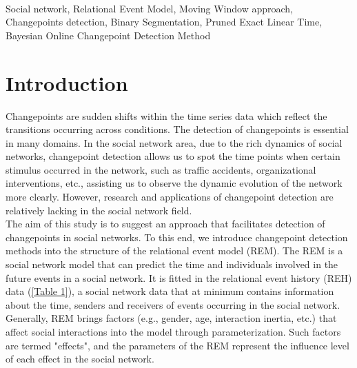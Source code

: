 \documentclass[]{interact}
\theoremstyle{plain}%
\theoremstyle{definition}
\theoremstyle{remark}
\begin{document}
	 \\
	{\small{Social network, Relational Event Model, Moving Window approach, Changepoints detection, Binary Segmentation, Pruned Exact Linear Time, Bayesian Online Changepoint Detection Method}
	
	\newpage


	\section{\fontsize{14}{15}\selectfont Introduction}
	
	\hspace{0.2cm} Changepoints are sudden shifts within the time series data which reflect the transitions occurring across conditions\cite{sharmaTrendAnalysisChange2016}\cite{aminikhanghahiSurveyMethodsTime2017}. The detection of changepoints is essential in many domains. In the social network area, due to the rich dynamics of social networks, changepoint detection allows us to spot the time points when certain stimulus occurred in the network, such as traffic accidents, organizational interventions, etc., assisting us to observe the dynamic evolution of the network more clearly. However, research and applications of changepoint detection are relatively lacking in the social network field.\\
	
	The aim of this study is to suggest an approach that facilitates detection of changepoints in social networks. To this end, we introduce changepoint detection methods into the structure of the relational event model (REM). The REM is a social network model that can predict the time and individuals involved in the future events in a social network. It is fitted in the relational event history (REH) data (\autoref{Table 1}), a social network data that at minimum contains information about the time, senders and receivers of events occurring in the social network. Generally, REM brings factors (e.g., gender, age, interaction inertia, etc.) that affect social interactions into the model through parameterization. Such factors are termed "effects"\cite{buttsRelationalEventFramework2008}, and the parameters of the REM represent the influence level of each effect in the social network. \\
	
}
\end{document}
